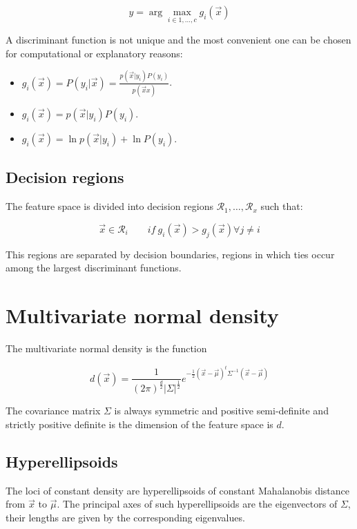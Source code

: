	$$y = \arg\max\limits_{i\in 1, \dots, c}g_i(\vec{x})$$

	A discriminant function is not unique and the most convenient one can be chosen for computational or explanatory reasons:

	\begin{multicols}{2}
		\begin{itemize}
			\item $g_i(\vec{x}) = P(y_i|\vec{x}) = \frac{p(\vec{x}|y_i)P(y_i)}{p(\vec{x}x)}$.
			\item $g_i(\vec{x}) = p(\vec{x}|y_i)P(y_i)$.
			\item $g_i(\vec{x}) = \ln p(\vec{x}|y_i) + \ln P(y_i)$.
		\end{itemize}
	\end{multicols}

	\subsection{Decision regions}
	The feature space is divided into decision regions $\mathcal{R}_1, \dots, \mathcal{R}_x$ such that:

	$$\vec{x}\in\mathcal{R}_i\qquad if\ g_i(\vec{x})>g_j(\vec{x})\forall j\neq i$$

	This regions are separated by decision boundaries, regions in which ties occur among the largest discriminant functions.

\section{Multivariate normal density}
The multivariate normal density is the function

$$d(\vec{x}) = \frac{1}{(2\pi)^\frac{d}{2}|\Sigma|^{\frac{1}{2}}}e^{-\frac{1}{2}(\vec{x}-\vec{\mu})^t\Sigma^{-1}(\vec{x}-\vec{\mu})}$$

The covariance matrix $\Sigma$ is always symmetric and positive semi-definite and strictly positive definite is the dimension of the feature space is $d$.

	\subsection{Hyperellipsoids}
	The loci of constant density are hyperellipsoids of constant Mahalanobis distance from $\vec{x}$ to $\vec{\mu}$.
	The principal axes of such hyperellipsoids are the eigenvectors of $\Sigma$, their lengths are given by the corresponding eigenvalues.

